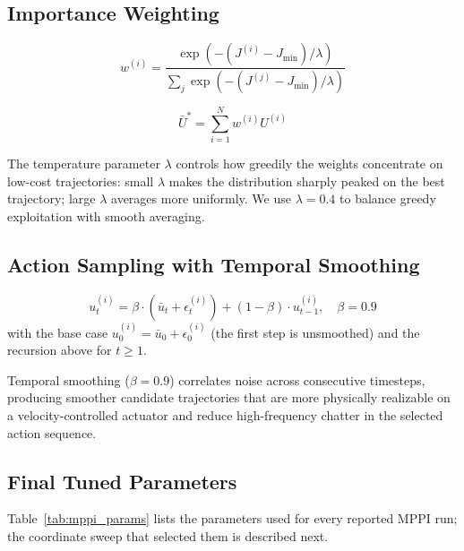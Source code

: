 \subsection{Importance Weighting}

\begin{equation}\label{eq:mppi_weight}
w^{(i)} = \frac{\exp(-(J^{(i)} - J_{\min}) / \lambda)}{\sum_j \exp(-(J^{(j)} - J_{\min}) / \lambda)}
\end{equation}

\begin{equation}\label{eq:mppi_weighted_mean}
\bar{U}^* = \sum_{i=1}^{N} w^{(i)} U^{(i)}
\end{equation}

The temperature parameter $\lambda$ controls how greedily the weights concentrate
on low-cost trajectories: small $\lambda$ makes the distribution sharply
peaked on the best trajectory; large $\lambda$ averages more uniformly.
We use $\lambda=0.4$ to balance greedy exploitation with smooth averaging.

\subsection{Action Sampling with Temporal Smoothing}

\begin{equation}\label{eq:mppi_smoothing}
u_t^{(i)} = \beta \cdot (\bar{u}_t + \epsilon_t^{(i)}) + (1-\beta) \cdot u_{t-1}^{(i)}, \quad \beta = 0.9
\end{equation}
with the base case $u_0^{(i)} = \bar{u}_0 + \epsilon_0^{(i)}$ (the first step is
unsmoothed) and the recursion above for $t \ge 1$.

Temporal smoothing ($\beta=0.9$) correlates noise across consecutive
timesteps, producing smoother candidate trajectories that are more
physically realizable on a velocity-controlled actuator and reduce
high-frequency chatter in the selected action sequence.

\subsection{Final Tuned Parameters}

Table~\ref{tab:mppi_params} lists the parameters used for every reported MPPI
run; the coordinate sweep that selected them is described next.

